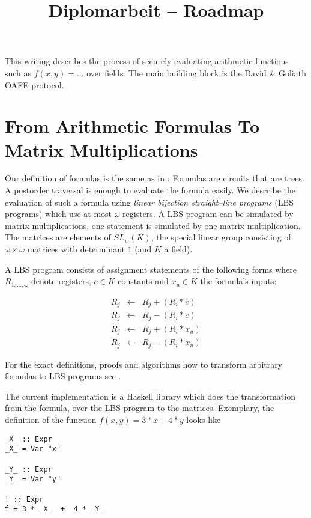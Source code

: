 \documentclass[12pt, a4paper]{article}
\title{Diplomarbeit -- Roadmap}
\begin{document}
\maketitle

This writing describes the process of securely evaluating arithmetic functions
such as $f(x,y) = ...$ over fields. The main building block is the David \&
Goliath OAFE protocol\cite{davidgoliath}.


\section{From Arithmetic Formulas To Matrix Multiplications}

Our definition of formulas is the same as in \cite{cleve91}: Formulas are
circuits that are trees. A postorder traversal is enough to evaluate the formula
easily. We describe the evaluation of such a formula using \emph{linear
bijection straight--line programs} (LBS programs)\cite{cleve91} which use at
most $\omega$ registers. A LBS program can be simulated by matrix
multiplications, one statement is simulated by one matrix multiplication. The
matrices are elements of $SL_w(K)$, the special linear group consisting of
$\omega \times \omega$ matrices with determinant $1$ (and $K$ a field).

A LBS program consists of assignment statements of the following
forms where $R_{1,...,\omega}$ denote registers, $c \in K$ constants and $x_u
\in K$ the formula's inputs:

\begin{eqnarray}
R_j & \leftarrow & R_j + (R_i * c) \\
R_j & \leftarrow & R_j - (R_i * c) \\
R_j & \leftarrow & R_j + (R_i * x_u) \\
R_j & \leftarrow & R_j - (R_i * x_u)
\end{eqnarray}

For the exact definitions, proofs and algorithms how to transform arbitrary
formulas to LBS programs see \cite{cleve91}.

The current implementation is a Haskell library which does the transformation
from the formula, over the LBS program to the matrices. Exemplary,
the definition of the function $f(x,y) = 3*x + 4*y$ looks like

\lstset{language=Haskell}

\begin{lstlisting}
_X_ :: Expr
_X_ = Var "x"

_Y_ :: Expr
_Y_ = Var "y"

f :: Expr
f = 3 * _X_  +  4 * _Y_
\end{lstlisting}
\end{document}
